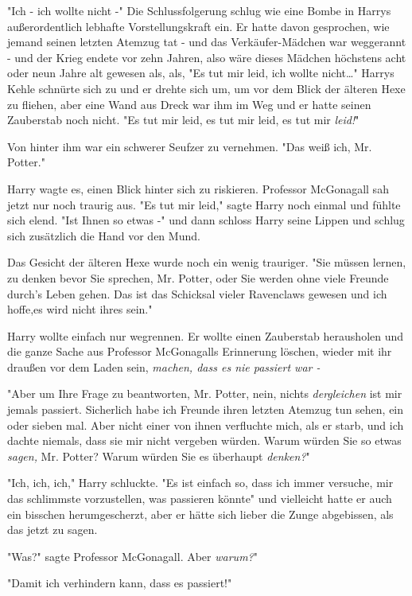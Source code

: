 {"Ich - ich wollte nicht -" Die Schlussfolgerung schlug wie eine Bombe in Harrys außerordentlich lebhafte Vorstellungskraft ein. Er hatte davon gesprochen, wie jemand seinen letzten Atemzug tat - und das Verkäufer-Mädchen war weggerannt - und der Krieg endete vor zehn Jahren, also wäre dieses Mädchen höchstens acht oder neun Jahre alt gewesen als, als, "Es tut mir leid, ich wollte nicht…" Harrys Kehle schnürte sich zu und er drehte sich um, um vor dem Blick der älteren Hexe zu fliehen, aber eine Wand aus Dreck war ihm im Weg und er hatte seinen Zauberstab noch nicht. "Es tut mir leid, es tut mir leid, es tut mir \emph{leid!}"

Von hinter ihm war ein schwerer Seufzer zu vernehmen. "Das weiß ich, Mr. Potter."

Harry wagte es, einen Blick hinter sich zu riskieren. Professor McGonagall sah jetzt nur noch traurig aus. "Es tut mir leid," sagte Harry noch einmal und fühlte sich elend. "Ist Ihnen so etwas -" und dann schloss Harry seine Lippen und schlug sich zusätzlich die Hand vor den Mund.

Das Gesicht der älteren Hexe wurde noch ein wenig trauriger. "Sie müssen lernen, zu denken bevor Sie sprechen, Mr. Potter, oder Sie werden ohne viele Freunde durch's Leben gehen. Das ist das Schicksal vieler Ravenclaws gewesen und ich hoffe,es wird nicht ihres sein."

Harry wollte einfach nur wegrennen. Er wollte einen Zauberstab herausholen und die ganze Sache aus Professor McGonagalls Erinnerung löschen, wieder mit ihr draußen vor dem Laden sein, \emph{machen, dass es nie passiert war -}

"Aber um Ihre Frage zu beantworten, Mr. Potter, nein, nichts \emph{dergleichen} ist mir jemals passiert. Sicherlich habe ich Freunde ihren letzten Atemzug tun sehen, ein oder sieben mal. Aber nicht einer von ihnen verfluchte mich, als er starb, und ich dachte niemals, dass sie mir nicht vergeben würden. Warum würden Sie so etwas \emph{sagen,} Mr. Potter? Warum würden Sie es überhaupt \emph{denken?}"

"Ich, ich, ich," Harry schluckte. "Es ist einfach so, dass ich immer versuche, mir das schlimmste vorzustellen, was passieren könnte" und vielleicht hatte er auch ein bisschen herumgescherzt, aber er hätte sich lieber die Zunge abgebissen, als das jetzt zu sagen.

"Was?" sagte Professor McGonagall. Aber \emph{warum?}"

"Damit ich verhindern kann, dass es passiert!"

}
